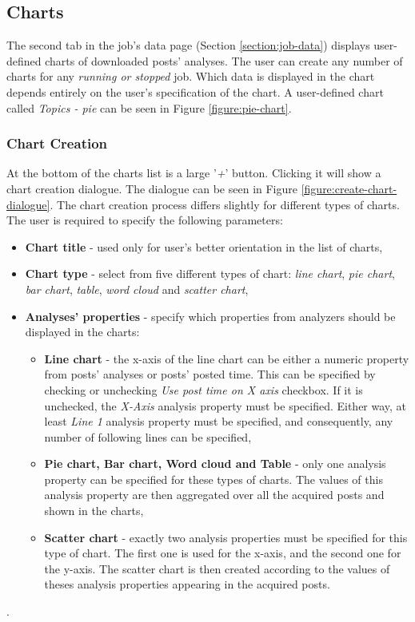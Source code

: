 \documentclass{article}
\begin{document}
\subsection{Charts}\label{section:job-analyses}
The second tab in the job's data page (Section \ref{section:job-data}) displays user-defined charts of downloaded posts' analyses. The user can create any number of charts for any \textit{running or stopped} job. Which data is displayed in the chart depends entirely on the user's specification of the chart. A user-defined chart called \textit{Topics - pie} can be seen in Figure \ref{figure:pie-chart}.

\subsubsection{Chart Creation}
At the bottom of the charts list is a large '\textit{+}' button. Clicking it will show a chart creation dialogue. The dialogue can be seen in Figure \ref{figure:create-chart-dialogue}. The chart creation process differs slightly for different types of charts. The user is required to specify the following parameters:
\begin{itemize}
    \item \textbf{Chart title} - used only for user's better orientation in the list of charts,
    \item \textbf{Chart type} - select from five different types of chart: \textit{line chart}, \textit{pie chart}, \textit{bar chart}, \textit{table}, \textit{word cloud} and \textit{scatter chart}, 
    \item \textbf{Analyses' properties} - specify which properties from analyzers should be displayed in the charts:
    \begin{itemize}
        \item \textbf{Line chart} - the x-axis of the line chart can be either a numeric property from posts' analyses or posts' posted time. This can be specified by checking or unchecking \textit{Use post time on X axis} checkbox. If it is unchecked, the \textit{X-Axis} analysis property must be specified. Either way, at least \textit{Line 1} analysis property must be specified, and consequently, any number of following lines can be specified,
        \item \textbf{Pie chart, Bar chart, Word cloud and Table} - only one analysis property can be specified for these types of charts. The values of this analysis property are then aggregated over all the acquired posts and shown in the charts,
        \item \textbf{Scatter chart} - exactly two analysis properties must be specified for this type of chart. The first one is used for the x-axis, and the second one for the y-axis. The scatter chart is then created according to the values of theses analysis properties appearing in the acquired posts.
    \end{itemize}
\end{itemize}.
\end{document}

